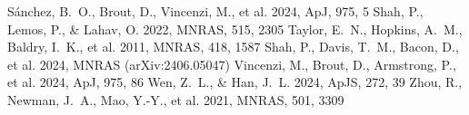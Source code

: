 \documentclass[twocolumn]{aastex701}
\begin{document}
\begin{thebibliography}{}
 S\'anchez, B.~O., Brout,
D., Vincenzi, M., et al. 2024, ApJ, 975, 5
 Shah, P., Lemos, P., \& Lahav, O.
2022, MNRAS, 515, 2305
 Taylor, E.~N., Hopkins, A.~M.,
Baldry, I.~K., et al. 2011, MNRAS, 418, 1587
 Shah, P., Davis, T.~M., Bacon,
D., et al. 2024, MNRAS (arXiv:2406.05047)
 Vincenzi, M., Brout, D.,
Armstrong, P., et al. 2024, ApJ, 975, 86
 Wen, Z.~L., \& Han, J.~L. 2024,
ApJS, 272, 39
 Zhou, R., Newman, J.~A., Mao,
Y.-Y., et al. 2021, MNRAS, 501, 3309
\end{thebibliography}
\end{document}
